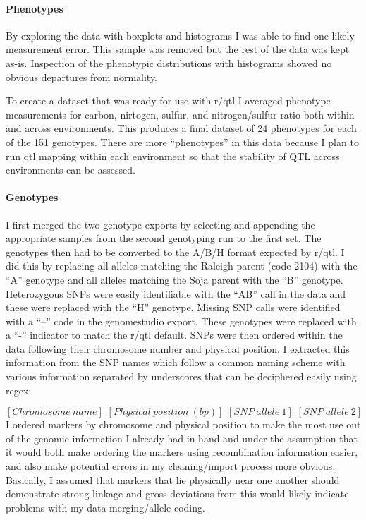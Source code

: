 \documentclass[
]{article}
\begin{document}
\hypertarget{phenotypes}{%
\paragraph{Phenotypes}\label{phenotypes}}

By exploring the data with boxplots and histograms I was able to find
one likely measurement error. This sample was removed but the rest of
the data was kept as-is. Inspection of the phenotypic distributions with
histograms showed no obvious departures from normality.

To create a dataset that was ready for use with r/qtl I averaged
phenotype measurements for carbon, nirtogen, sulfur, and nitrogen/sulfur
ratio both within and across environments. This produces a final dataset
of 24 phenotypes for each of the 151 genotypes. There are more
``phenotypes'' in this data because I plan to run qtl mapping within
each environment so that the stability of QTL across environments can be
assessed.

\hypertarget{genotypes}{%
\paragraph{Genotypes}\label{genotypes}}

I first merged the two genotype exports by selecting and appending the
appropriate samples from the second genotyping run to the first set. The
genotypes then had to be converted to the A/B/H format expected by
r/qtl. I did this by replacing all alleles matching the Raleigh parent
(code 2104) with the ``A'' genotype and all alleles matching the Soja
parent with the ``B'' genotype. Heterozygous SNPs were easily
identifiable with the ``AB'' call in the data and these were replaced
with the ``H'' genotype. Missing SNP calls were identified with a ``--''
code in the genomestudio export. These genotypes were replaced with a
``-'' indicator to match the r/qtl default. SNPs were then ordered
within the data following their chromosome number and physical position.
I extracted this information from the SNP names which follow a common
naming scheme with various information separated by underscores that can
be deciphered easily using regex:

\[[Chromosome\ name]\_[Physical\ position\ (bp)]\_[SNP\ allele\ 1]\_[SNP\ allele\ 2]\]
I ordered markers by chromosome and physical position to make the most
use out of the genomic information I already had in hand and under the
assumption that it would both make ordering the markers using
recombination information easier, and also make potential errors in my
cleaning/import process more obvious. Basically, I assumed that markers
that lie physically near one another should demonstrate strong linkage
and gross deviations from this would likely indicate problems with my
data merging/allele coding.
\end{document}
